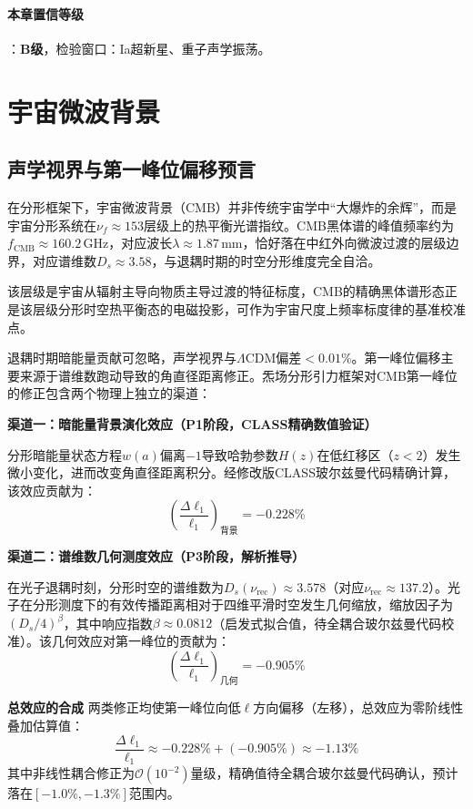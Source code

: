 \documentclass[12pt,a4paper,twocolumn]{article}
\begin{document}
\paragraph{本章置信等级}：\textbf{B级}，检验窗口：Ia超新星、重子声学振荡。

\section{宇宙微波背景}
\label{sec:cmb}

\subsection{声学视界与第一峰位偏移预言}
\label{subsec:cmb_peak}

在分形框架下，宇宙微波背景（CMB）并非传统宇宙学中``大爆炸的余辉''，而是宇宙分形系统在$\nu_f \approx 153$层级上的热平衡光谱指纹。CMB黑体谱的峰值频率约为$f_{\text{CMB}} \approx 160.2$\,GHz，对应波长$\lambda \approx 1.87$\,mm，恰好落在中红外向微波过渡的层级边界，对应谱维数$D_s \approx 3.58$，与退耦时期的时空分形维度完全自洽。

该层级是宇宙从辐射主导向物质主导过渡的特征标度，CMB的精确黑体谱形态正是该层级分形时空热平衡态的电磁投影，可作为宇宙尺度上频率标度律的基准校准点。

退耦时期暗能量贡献可忽略，声学视界与$\Lambda$CDM偏差$<0.01\%$。第一峰位偏移主要来源于谱维数跑动导致的角直径距离修正。炁场分形引力框架对CMB第一峰位的修正包含两个物理上独立的渠道：

\textbf{渠道一：暗能量背景演化效应（P1阶段，CLASS精确数值验证）}

分形暗能量状态方程$w(a)$偏离$-1$导致哈勃参数$H(z)$在低红移区（$z<2$）发生微小变化，进而改变角直径距离积分。经修改版CLASS玻尔兹曼代码精确计算，该效应贡献为：
\[
\left(\frac{\Delta\ell_1}{\ell_1}\right)_{\text{背景}} = -0.228\%
\]

\textbf{渠道二：谱维数几何测度效应（P3阶段，解析推导）}

在光子退耦时刻，分形时空的谱维数为$D_s(\nu_{\text{rec}}) \approx 3.578$（对应$\nu_{\text{rec}} \approx 137.2$）。光子在分形测度下的有效传播距离相对于四维平滑时空发生几何缩放，缩放因子为$(D_s/4)^\beta$，其中响应指数$\beta \approx 0.0812$（启发式拟合值，待全耦合玻尔兹曼代码校准）。该几何效应对第一峰位的贡献为：
\[
\left(\frac{\Delta\ell_1}{\ell_1}\right)_{\text{几何}} = -0.905\%
\]

\textbf{总效应的合成}
两类修正均使第一峰位向低$\ell$方向偏移（左移），总效应为零阶线性叠加估算值：
\[
\frac{\Delta\ell_1}{\ell_1} \approx -0.228\% + (-0.905\%) \approx -1.13\%
\]
其中非线性耦合修正为$\mathcal{O}(10^{-2})$量级，精确值待全耦合玻尔兹曼代码确认，预计落在$[-1.0\%, -1.3\%]$范围内。
\end{document}
